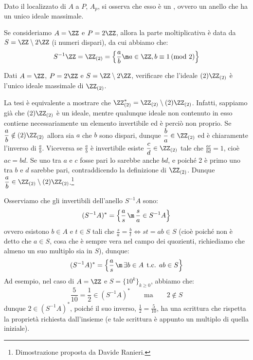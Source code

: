 \documentclass[11pt]{scrartcl}
\begin{document}
\begin{remark}
    Dato il localizzato di $A$ a $P$, $A_p$, si osserva che esso è un , ovvero un anello che ha un unico ideale massimale.
\end{remark}

\begin{example}
    Se consideriamo $A = \ZZ$ e $P = 2\ZZ$, allora la parte moltiplicativa è data da $S = \ZZ\setminus 2\ZZ$ (i numeri dispari), da cui abbiamo che:
    \[ S^{-1}\ZZ = \ZZ_{(2)} = \left\{\frac{a}{b} \m a \in \ZZ, b \equiv 1 \, \text{(mod 2)}\right\}
        \]
\end{example}

\begin{exercise}
    Dati $A = \ZZ$, $P = 2\ZZ$ e $S = \ZZ\setminus 2\ZZ$, verificare che l'ideale $(2)\ZZ_{(2)}$ è l'unico ideale massimale di $\ZZ_{(2)}$.
\end{exercise}

\begin{soln}
    La tesi è equivalente a mostrare che $\ZZ_{(2)}^*=\ZZ_{(2)}\setminus (2)\ZZ_{(2)}$. Infatti, sappiamo già che 
    $(2)\ZZ_{(2)}$ è un ideale, mentre qualunque ideale non contenuto in esso contiene necessariamente un elemento invertibile ed è perciò non proprio.
    Se $\displaystyle\frac{a}{b}\notin (2)\ZZ_{(2)}$ allora sia $a$ che $b$ sono dispari, dunque $\displaystyle\frac{b}{a}\in\ZZ_{(2)}$ ed è chiaramente l'inverso di $\displaystyle\frac{a}{b}$.
    Viceversa se $\displaystyle\frac{a}{b}$ è invertibile esiste $\displaystyle\frac{c}{d}\in\ZZ_{(2)}$ tale che $\displaystyle\frac{ac}{bd}=1$, cioè $ac=bd$. Se uno tra $a$ e $c$ fosse pari lo sarebbe
    anche $bd$, e poiché 2 è primo uno tra $b$ e $d$ sarebbe pari, contraddicendo la definizione di $\ZZ_{(2)}$. Dunque $\displaystyle\frac{a}{b}\in\ZZ_{(2)}\setminus (2)\ZZ_{(2)}$.\footnote{Dimostrazione proposta da Davide Ranieri.}
\end{soln}

\begin{remark}
    Osserviamo che gli invertibili dell'anello $S^{-1}A$ sono:
    \[ (S^{-1}A)^* = \left\{\frac{a}{s} \,\m\, \frac{s}{a} \in S^{-1}A\right\}
        \]
    ovvero esistono $b \in A$ e $t \in S$ tali che $\displaystyle \frac{s}{a} = \frac{b}{t} \iff st = ab \in S$ (cioè poiché non è detto che $a \in S$, cosa che è sempre vera nel campo dei quozienti, richiediamo che almeno un suo multiplo sia in $S$), dunque:
    \[ (S^{-1}A)^* = \left\{\frac{a}{s} \,\m\, \exists b \in A \;\, \text{t.c.} \;\, ab \in S\right\}
        \]
    Ad esempio, nel caso di $A = \ZZ$ e $S = \{10^k\}_{k\geq 0}$, abbiamo che:
    \[ \frac{5}{10}=\frac{1}{2} \in (S^{-1}A)^* \qquad \text{ma} \qquad 2 \not \in S
        \]
    dunque $2 \in (S^{-1}A)^*$, poiché il suo inverso, $\displaystyle \frac{1}{2} = \frac{5}{10}$, ha una scrittura che rispetta la proprietà richiesta dall'insieme (e tale scrittura è appunto un multiplo di quella iniziale).
\end{remark}
\end{document}
